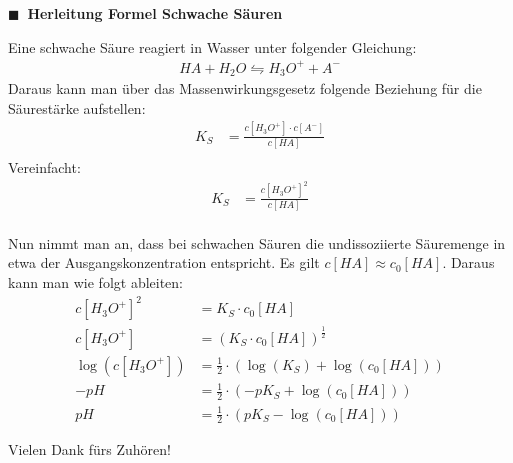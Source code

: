 \documentclass[aspectratio=169,9pt]{beamer}
\newcommand{\antwort}[1]{
\begin{tcolorbox}[
	enhanced,
	colframe=unigrau!65,
	sharp corners,
	boxsep=1pt,
	colback=white,
	coltitle=black,
]
	#1
	\end{tcolorbox}
}
\begin{document}
\begin{frame}


\begin{minipage}{.5\textwidth}
{\color{miugray}$\blacksquare ~$} \textbf{Herleitung Formel Schwache Säuren  } \par \vspace*{2mm}

\antwort{
Eine schwache Säure reagiert in Wasser unter folgender Gleichung: 
\begin{align*}
HA + H_2O \leftrightharpoons H_3O^+ + A^-
\end{align*}
Daraus kann man über das Massenwirkungsgesetz folgende Beziehung für die Säurestärke aufstellen:
\begin{align*}
K_S &= \frac{c[H_3O^+] \cdot c[A^-]}{c[HA]} \\
\end{align*}
Vereinfacht:
\begin{align*}
K_S &= \frac{c[H_3O^+]^2}{c[HA]} \\
\end{align*}
}

\end{minipage}%
\hspace*{4mm}
\begin{minipage}{.5\textwidth}
\antwort{
Nun nimmt man an, dass bei schwachen Säuren die undissoziierte Säuremenge in etwa der Ausgangskonzentration entspricht. Es gilt $c[HA] \approx c_0[HA]$. Daraus kann man wie folgt ableiten:
\begin{align*}
c[H_3O^+]^2 &= K_S \cdot c_0[HA] \\
c[H_3O^+] &= \left( K_S \cdot c_0[HA]\right) ^{\frac{1}{2}} \\
\log(c[H_3O^+]) &= \frac{1}{2} \cdot \left( \log(K_S) + \log(c_0[HA]) \right) \\
- pH &= \frac{1}{2} \cdot (-pK_S + \log(c_0[HA]) )\\
pH &= \frac{1}{2} \cdot (pK_S - \log(c_0[HA]))
\end{align*}
}
\end{minipage}%

\end{frame}





\begin{frame}

\begin{center}
\LARGE
Vielen Dank fürs Zuhören!
\end{center}

\end{frame}
\end{document}
